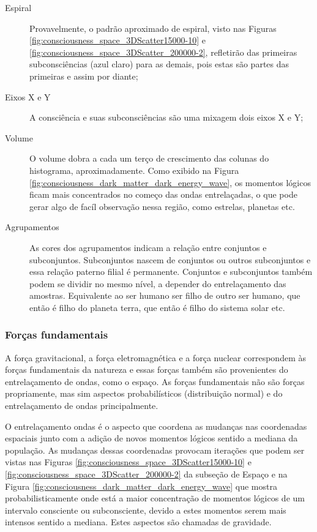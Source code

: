 	\begin{description}
	   \item[Espiral] Provavelmente, o padrão aproximado de espiral, visto nas Figuras \ref{fig:consciousness_space_3DScatter15000-10} e \ref{fig:consciousness_space_3DScatter_200000-2}, refletirão das primeiras subconsciências (azul claro) para as demais, pois estas são partes das primeiras e assim por diante;
	   \item[Eixos X e Y] A consciência e suas subconsciências são uma mixagem dois eixos X e Y;
	   \item[Volume] O volume dobra a cada um terço de crescimento das colunas do histograma, aproximadamente. Como exibido na Figura \ref{fig:consciousness_dark_matter_dark_energy_wave}, os momentos lógicos ficam mais concentrados no começo das ondas entrelaçadas, o que pode gerar algo de facíl observação nessa região, como estrelas, planetas etc. 
	   \item[Agrupamentos] As cores dos agrupamentos indicam a relação entre conjuntos e subconjuntos. Subconjuntos nascem de conjuntos ou outros subconjuntos e essa relação paterno filial é permanente. Conjuntos e subconjuntos também podem se dividir no mesmo nível, a depender do entrelaçamento das amostras. Equivalente ao ser humano ser filho de outro ser humano, que então é filho do planeta terra, que então é filho do sistema solar etc.
	\end{description}

\subsubsection{Forças fundamentais}
A força gravitacional, a força eletromagnética e a força nuclear correspondem às forças fundamentais da natureza e essas forças também são provenientes do entrelaçamento de ondas, como o espaço. As forças fundamentais não são forças propriamente, mas sim aspectos probabilísticos (distribuição normal) e do entrelaçamento de ondas principalmente.

O entrelaçamento ondas é o aspecto que coordena as mudanças nas coordenadas espaciais junto com a adição de novos momentos lógicos sentido a mediana da população. As mudanças dessas coordenadas provocam iterações que podem ser vistas nas Figuras \ref{fig:consciousness_space_3DScatter15000-10} e \ref{fig:consciousness_space_3DScatter_200000-2} da subseção de Espaço e na Figura \ref{fig:consciousness_dark_matter_dark_energy_wave} que mostra probabilisticamente onde está a maior concentração de momentos lógicos de um intervalo consciente ou subconsciente, devido a estes momentos serem mais intensos sentido a mediana. Estes aspectos são chamadas de gravidade.

